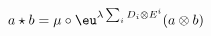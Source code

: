\begin{equation}
        \label{eq:CDformula}
        a \star b 
        = \mu \circ \eu^{\lambda \sum_i D_i \otimes E^i} (a \otimes b)
    \end{equation}

